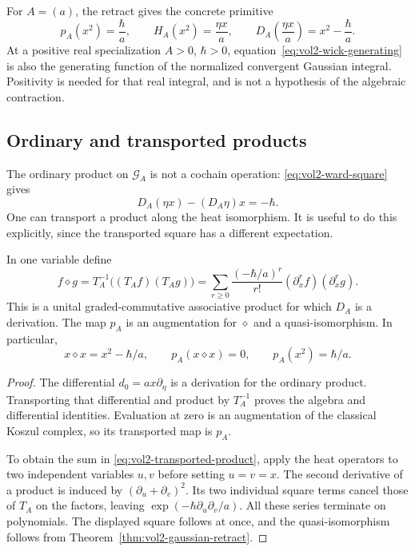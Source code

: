 For $A=(a)$, the retract gives the concrete primitive
\begin{equation}\label{eq:vol2-quadratic-primitive}
 p_A(x^2)=\frac{\hbar}{a},\qquad
 H_A(x^2)=\frac{\eta x}{a},\qquad
 D_A\left(\frac{\eta x}{a}\right)=x^2-\frac{\hbar}{a}.
\end{equation}
At a positive real specialization $A>0$, $\hbar>0$,
equation~\eqref{eq:vol2-wick-generating} is also the generating
function of the normalized convergent Gaussian integral.
Positivity is needed for that real integral, and is not a
hypothesis of the algebraic contraction.

\subsection{Ordinary and transported products}

The ordinary product on $\mathcal G_A$ is not a cochain operation:
\eqref{eq:vol2-ward-square} gives
\[
 D_A(\eta x)-(D_A\eta)x=-\hbar.
\]
One can transport a product along the heat isomorphism. It is
useful to do this explicitly, since the transported square has a
different expectation.

\begin{proposition}\label{prop:vol2-transported-product}
In one variable define
\begin{equation}\label{eq:vol2-transported-product}
 f\diamond g=T_A^{-1}\bigl((T_Af)(T_Ag)\bigr)
 =\sum_{r\geq0}\frac{(-\hbar/a)^r}{r!}
                  (\partial_x^rf)(\partial_x^rg).
\end{equation}
This is a unital graded-commutative associative product for which
$D_A$ is a derivation. The map $p_A$ is an augmentation for
$\diamond$ and a quasi-isomorphism. In particular,
\[
 x\diamond x=x^2-\hbar/a,\qquad
 p_A(x\diamond x)=0,\qquad p_A(x^2)=\hbar/a.
\]
\end{proposition}
\begin{proof}
The differential $d_0=ax\partial_\eta$ is a derivation for the
ordinary product. Transporting that differential and product by
$T_A^{-1}$ proves the algebra and differential identities.
Evaluation at zero is an augmentation of the classical Koszul
complex, so its transported map is $p_A$.

To obtain the sum in \eqref{eq:vol2-transported-product}, apply
the heat operators to two independent variables $u,v$ before
setting $u=v=x$. The second derivative of a product is induced
by $(\partial_u+\partial_v)^2$. Its two individual square terms
cancel those of $T_A$ on the factors, leaving
$\exp(-\hbar\partial_u\partial_v/a)$. All these series terminate
on polynomials. The displayed square follows at once, and the
quasi-isomorphism follows from Theorem~\ref{thm:vol2-gaussian-retract}.
\end{proof}

